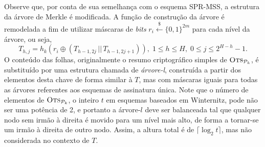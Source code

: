 \documentclass[12pt,notitlepage]{report}
\newcommand{\pk}{\mathcal{P}_k}
\newcommand{\concat}{\, \vert \vert \,}
\newcommand{\binwds}[1]{\{0, 1\}^{#1}}
\begin{document}
Observe que, por conta de sua semelhança com o esquema SPR-MSS, a estrutura da árvore de Merkle é modificada. A função de construção da árvore é remodelada a fim de utilizar máscaras de \emph{bits} $r_i \stackrel{\$}{\longleftarrow} \binwds{2m}$ para cada nível da árvore, ou seja,
\begin{equation}
    T_{h, j} = h_k(r_i \oplus (T_{h - 1, 2j} \concat T_{h - 1, 2j + 1})),
      \; 1 \leq h \leq H, \; 0 \leq j \leq 2^{H - h} - 1.
\end{equation}
O conteúdo das folhas, originalmente o resumo criptográfico simples de $\textsc{Ots}_{\pk{}}$, é substituído por uma estrutura chamada de \emph{árvore-l}, construída a partir dos elementos desta chave de forma similar à $T$, mas com máscaras iguais para todas as árvores referentes aos esquemas de assinatura única. Note que o número de elementos de $\textsc{Ots}_{\pk{}}$, o inteiro $t$ em esquemas baseados em Winternitz, pode não ser uma potência de 2, e portanto a árvore-$l$ deve ser balanceada tal que qualquer nodo sem irmão à direita é movido para um nível mais alto, de forma a tornar-se um irmão à direita de outro nodo. Assim, a altura total é de $\lceil \log_{2} t \rceil$, mas não considerada no contexto de $T$.
\end{document}
